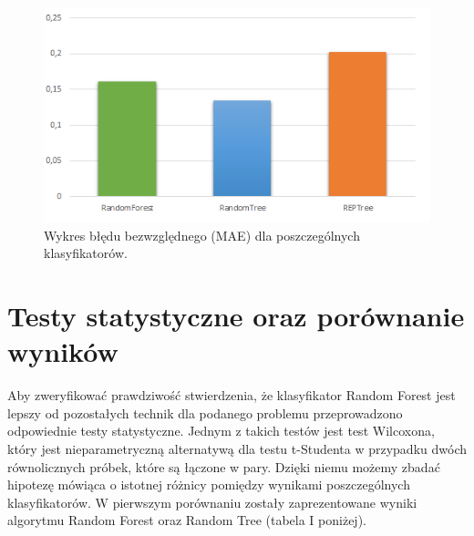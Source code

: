 \documentclass[conference]{IEEEtran}
\begin{document}
\begin{figure}[htbp]
\centerline{\includegraphics[scale=0.65]{pic/MAE_chart.png}}
\caption{Wykres błędu bezwzględnego (MAE) dla poszczególnych klasyfikatorów.}
\label{MAE_chart}
\end{figure}

\section{Testy statystyczne oraz porównanie wyników}
Aby zweryfikować prawdziwość stwierdzenia, że klasyfikator Random Forest jest lepszy od pozostałych technik dla podanego problemu przeprowadzono odpowiednie testy statystyczne. 
Jednym z takich testów jest test Wilcoxona, który jest nieparametryczną alternatywą dla testu t-Studenta w przypadku dwóch równolicznych próbek, które są łączone w pary. Dzięki niemu możemy zbadać hipotezę mówiąca o istotnej różnicy pomiędzy wynikami poszczególnych klasyfikatorów. W pierwszym porównaniu zostały zaprezentowane wyniki algorytmu Random Forest oraz Random Tree (tabela I poniżej). 
\end{document}
